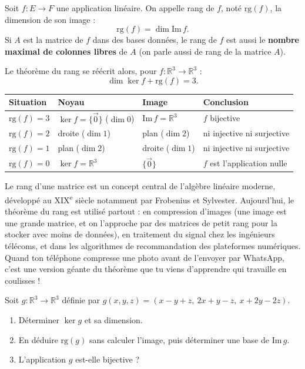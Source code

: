\documentclass[11pt]{article}
\newcommand{\cle}[1]{{\popxbold\color{popdark}#1}}
\begin{document}
\begin{definition}
Soit $f : E \to F$ une application linéaire. On appelle \cle{rang} de $f$, noté $\mathrm{rg}(f)$, la dimension de son image :
\[
\mathrm{rg}(f) = \dim \mathrm{Im}\, f.
\]
Si $A$ est la matrice de $f$ dans des bases données, le rang de $f$ est aussi le \textbf{nombre maximal de colonnes libres} de $A$ (on parle aussi de rang de la matrice $A$).
\end{definition}

Le théorème du rang se réécrit alors, pour $f : \mathbb{R}^3 \to \mathbb{R}^3$ :
\[
\dim \ker f + \mathrm{rg}(f) = 3.
\]

\begin{center}
\begin{tabularx}{\linewidth}{|l|X|X|X|}
\hline
\rowcolor{popblueL} \textbf{Situation} & \textbf{Noyau} & \textbf{Image} & \textbf{Conclusion} \\
\hline
$\mathrm{rg}(f) = 3$ & $\ker f = \{\vec{0}\}$ ($\dim 0$) & $\mathrm{Im}\, f = \mathbb{R}^3$ & $f$ bijective \\
\hline
$\mathrm{rg}(f) = 2$ & droite ($\dim 1$) & plan ($\dim 2$) & ni injective ni surjective \\
\hline
$\mathrm{rg}(f) = 1$ & plan ($\dim 2$) & droite ($\dim 1$) & ni injective ni surjective \\
\hline
$\mathrm{rg}(f) = 0$ & $\ker f = \mathbb{R}^3$ & $\{\vec{0}\}$ & $f$ est l'application nulle \\
\hline
\end{tabularx}
\end{center}

\begin{savaistu}
Le \og rang \fg{} d'une matrice est un concept central de l'algèbre linéaire moderne, développé au XIX\textsuperscript{e} siècle notamment par Frobenius et Sylvester. Aujourd'hui, le théorème du rang est utilisé partout : en compression d'images (une image est une grande matrice, et on l'approche par des matrices de petit rang pour la stocker avec moins de données), en traitement du signal chez les ingénieurs télécoms, et dans les algorithmes de recommandation des plateformes numériques. Quand ton téléphone compresse une photo avant de l'envoyer par WhatsApp, c'est une version géante du théorème que tu viens d'apprendre qui travaille en coulisses !
\end{savaistu}

\begin{exercice}
Soit $g : \mathbb{R}^3 \to \mathbb{R}^3$ définie par $g(x, y, z) = (x - y + z,\ 2x + y - z,\ x + 2y - 2z)$.
\begin{enumerate}
\item Déterminer $\ker g$ et sa dimension.
\item En déduire $\mathrm{rg}(g)$ sans calculer l'image, puis déterminer une base de $\mathrm{Im}\, g$.
\item L'application $g$ est-elle bijective ?
\end{enumerate}
\end{exercice}
\end{document}

